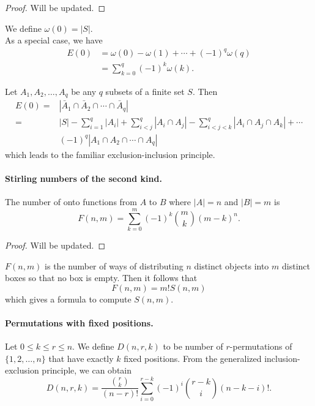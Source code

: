 \documentclass[14pt,english,oneside]{scrbook}
\numberwithin{equation}{chapter}
\theoremstyle{definition}
\theoremstyle{plain}
\begin{document}
\begin{proof}
  Will be updated.
\end{proof}

We define $\omega(0) = |S|$. \\

As a special case, we have
\begin{align*}
  E(0) &= \omega(0) - \omega(1) + \cdots + (-1)^q \omega(q) \\
       &= \sum_{k=0}^q (-1)^k \omega(k).
\end{align*}

Let $A_1, A_2, \ldots, A_q$ be any $q$ subsets of a finite set $S$. Then
\begin{align*}
  E(0)=&|\bar A_1 \cap \bar A_2 \cap \cdots \cap \bar A_q | \\
  =&|S| - \sum_{i=1}^q |A_i| + \sum_{i<j}^q |A_i \cap A_j | - \sum_{i<j<k}^q |A_i \cap A_j \cap A_k | + \cdots \\
  &(-1)^q |A_1 \cap A_2 \cap \cdots \cap A_q |
\end{align*}
which leads to the familiar exclusion-inclusion principle.

\paragraph{Stirling numbers of the second kind.}

The number of onto functions from $A$ to $B$ where $|A|=n$ and $|B|=m$ is
\begin{equation}
  F(n,m) = \sum_{k=0}^m (-1)^k \binom{m}{k} (m-k)^n.
\end{equation}

\begin{proof}
  Will be updated.
\end{proof}

$F(n,m)$ is the number of ways of distributing $n$ distinct objects into $m$ distinct boxes so that no box is empty. Then it follows that
\begin{equation}
  F(n,m) = m! S(n,m)
\end{equation}
which gives a formula to compute $S(n,m)$.

\paragraph{Permutations with fixed positions.}

Let $0\leq k \leq r \leq n$. We define $D(n,r,k)$ to be number of $r$-permutations of $\{1,2,\ldots,n\}$ that have exactly $k$ fixed positions. From the generalized inclusion-exclusion principle, we can obtain
\begin{equation}
  D(n,r,k) = \frac{\binom{r}{k}}{(n-r)!} \sum_{i=0}^{r-k} (-1)^i \binom{r-k}{i}(n-k-i)!.
\end{equation}
\end{document}
